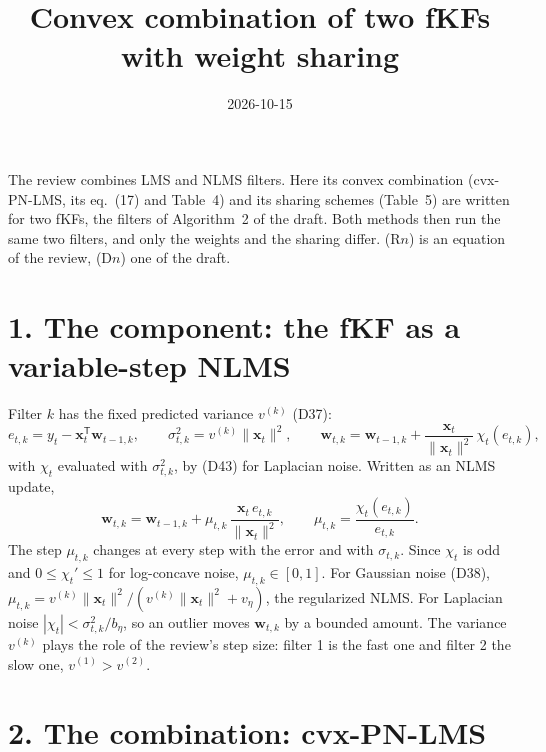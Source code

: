 \documentclass[11pt]{article}
\title{Convex combination of two fKFs with weight sharing}
\date{2026-10-15}
\author{}
\newcommand{\bx}{\boldsymbol{x}}
\newcommand{\bw}{\boldsymbol{w}}
\newcommand{\T}{^{\mathsf T}}
\begin{document}
\maketitle

The review combines LMS and NLMS filters. Here its convex combination (cvx-PN-LMS, its eq.~(17) and Table~4) and its
sharing schemes (Table~5) are written for two fKFs, the filters of Algorithm~2 of the draft. Both methods then run the
same two filters, and only the weights and the sharing differ. (R$n$) is an equation of the review, (D$n$) one of the
draft.

\section*{1. The component: the fKF as a variable-step NLMS}

Filter $k$ has the fixed predicted variance $v^{(k)}$ (D37):
\begin{equation}
  e_{t,k} = y_t - \bx_t\T\bw_{t-1,k}, \qquad
  \sigma_{t,k}^2 = v^{(k)}\|\bx_t\|^2, \qquad
  \bw_{t,k} = \bw_{t-1,k} + \frac{\bx_t}{\|\bx_t\|^2}\,\chi_t(e_{t,k}),
  \label{fkf}
\end{equation}
with $\chi_t$ evaluated with $\sigma_{t,k}^2$, by (D43) for Laplacian noise. Written as an NLMS update,
\begin{equation}
  \bw_{t,k} = \bw_{t-1,k} + \mu_{t,k}\,\frac{\bx_t\,e_{t,k}}{\|\bx_t\|^2}, \qquad
  \mu_{t,k} = \frac{\chi_t(e_{t,k})}{e_{t,k}} .
  \label{vss}
\end{equation}
The step $\mu_{t,k}$ changes at every step with the error and with $\sigma_{t,k}$. Since $\chi_t$ is odd and
$0 \le \chi_t' \le 1$ for log-concave noise, $\mu_{t,k} \in [0, 1]$. For Gaussian noise (D38),
$\mu_{t,k} = v^{(k)}\|\bx_t\|^2 / (v^{(k)}\|\bx_t\|^2 + v_\eta)$, the regularized NLMS. For Laplacian noise
$|\chi_t| < \sigma_{t,k}^2/b_\eta$, so an outlier moves $\bw_{t,k}$ by a bounded amount. The variance $v^{(k)}$ plays the
role of the review's step size: filter 1 is the fast one and filter 2 the slow one, $v^{(1)} > v^{(2)}$.

\section*{2. The combination: cvx-PN-LMS}
\end{document}
